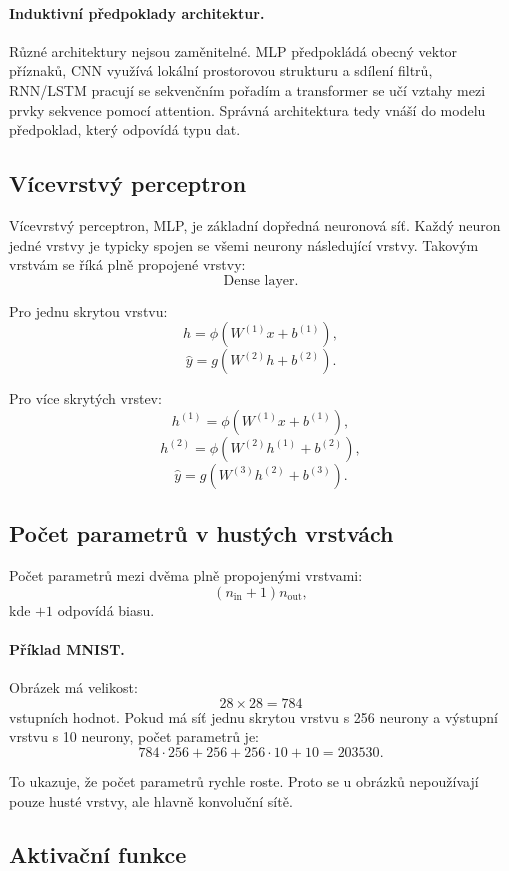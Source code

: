 \paragraph{Induktivní předpoklady architektur.}
Různé architektury nejsou zaměnitelné. MLP předpokládá obecný vektor příznaků, CNN využívá lokální
prostorovou strukturu a sdílení filtrů, RNN/LSTM pracují se sekvenčním pořadím a transformer se učí vztahy
mezi prvky sekvence pomocí attention. Správná architektura tedy vnáší do modelu předpoklad, který odpovídá
typu dat.

\subsection{Vícevrstvý perceptron}

Vícevrstvý perceptron, MLP, je základní dopředná neuronová síť. Každý neuron jedné vrstvy je typicky spojen
se všemi neurony následující vrstvy. Takovým vrstvám se říká plně propojené vrstvy:
\[
\text{Dense layer}.
\]

Pro jednu skrytou vrstvu:
\[
h = \phi(W^{(1)}x+b^{(1)}),
\]
\[
\hat y = g(W^{(2)}h+b^{(2)}).
\]

Pro více skrytých vrstev:
\[
h^{(1)} = \phi(W^{(1)}x+b^{(1)}),
\]
\[
h^{(2)} = \phi(W^{(2)}h^{(1)}+b^{(2)}),
\]
\[
\hat y = g(W^{(3)}h^{(2)}+b^{(3)}).
\]

\subsection{Počet parametrů v hustých vrstvách}

Počet parametrů mezi dvěma plně propojenými vrstvami:
\[
(n_{\text{in}}+1)n_{\text{out}},
\]
kde $+1$ odpovídá biasu.

\paragraph{Příklad MNIST.}
Obrázek má velikost:
\[
28 \times 28 = 784
\]
vstupních hodnot. Pokud má síť jednu skrytou vrstvu s 256 neurony a výstupní vrstvu s 10 neurony, počet
parametrů je:
\[
784\cdot 256 + 256 + 256\cdot 10 + 10 = 203530.
\]

To ukazuje, že počet parametrů rychle roste. Proto se u obrázků nepoužívají pouze husté vrstvy, ale hlavně
konvoluční sítě.

\subsection{Aktivační funkce}

